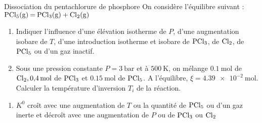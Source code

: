 \documentclass[french, a4paper, 11pt]{article}
\begin{document}
\begin{cadre}{Dissociation du pentachlorure de phosphore}
  On considère l'équilibre suivant : \(\ce{PCl5(g) = PCl3(g) + Cl2(g)}\)
  \begin{enumerate}
    \item Indiquer l'influence d'une élévation isotherme de \(P\), d'une augmentation isobare de \(T\),
    d'une introduction isotherme et isobare de \(\ce{PCl3}\), de \(\ce{Cl2}\), de \(\ce{PCl5}\) ou d'un gaz inactif.
    \item Sous une pression constante \(P=\SI{3}{\bar}\) et à \(\SI{500}\kelvin\), on mélange \(\SI{0.1}{\mole}\)
    de \(\ce{Cl2}, \SI{0.4}{\mole}\) de \(\ce{PCl3}\) et \(\SI{0.15}{\mole}\) de \(\ce{PCl5}\).
    A l'équilibre, \(\xi = \SI{4.39e-2}{\mole}\). Calculer la température d'inversion \(T_i\) de la réaction.
  \end{enumerate}

  \tcblower
  \begin{enumerate}
    \item \(K^0\) croît avec une augmentation de \(T\) ou la quantité de \(\ce{PCl5}\) ou d'un gaz inerte et 
    décroît avec une augmentation de \(P\) ou de \(\ce{PCl3}\) ou \(\ce{Cl2}\)
  \end{enumerate}
\end{cadre}
\end{document}
